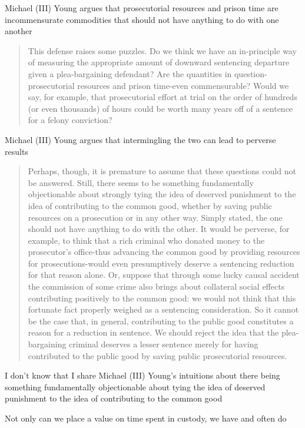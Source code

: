 Michael (III) Young argues that prosecutorial resources and prison time are incommensurate commodities that should not have anything to do with one another

\begin{quote}
    This defense raises some puzzles. Do we think we have an in-principle way of measuring the appropriate amount of downward sentencing departure given a plea-bargaining defendant? Are the quantities in question-prosecutorial resources and prison time-even commensurable? Would we say, for example, that prosecutorial effort at trial on the order of hundreds (or even thousands) of hours could be worth many years off of a sentence for a felony conviction?
\end{quote}

Michael (III) Young  argues that intermingling the two can lead to perverse results

\begin{quote}
    Perhaps, though, it is premature to assume that these questions could not be answered. Still, there seems to be something fundamentally objectionable about strongly tying the idea of deserved punishment to the idea of contributing to the common good, whether by saving public resources on a prosecution or in any other way. Simply stated, the one should not have anything to do with the other. It would be perverse, for example, to think that a rich criminal who donated money to the prosecutor's office-thus advancing the common good by providing resources for prosecutions-would even presumptively deserve a sentencing reduction for that reason alone. Or, suppose that through some lucky causal accident the commission of some crime also brings about collateral social effects contributing positively to the common good: we would not think that this fortunate fact properly weighed as a sentencing consideration. So it cannot be the case that, in general, contributing to the public good constitutes a reason for a reduction in sentence. We should reject the idea that the plea-bargaining criminal deserves a lesser sentence merely for having contributed to the public good by saving public prosecutorial resources.
\end{quote}

I don't know that I share Michael (III) Young's intuitions about there being something fundamentally objectionable about tying the idea of deserved punishment to the idea of contributing to the common good

Not only can we place a value on time spent in custody, we have and often do

